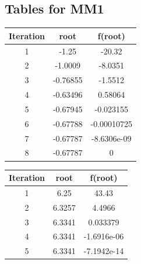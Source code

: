 \subsection{Tables for MM1}
\begin{center}
  \begin{tabular}{| c  c c |}
\hline
Iteration & root         & f(root) \\
\hline
1    &     -1.25  &        -20.32 \\
\hline
2    &   -1.0009  &       -8.0351 \\
\hline
3    &  -0.76855  &       -1.5512 \\
\hline
4    &  -0.63496  &       0.58064 \\
\hline
5    &  -0.67945  &     -0.023155 \\
\hline
6    & -0.67788   &  -0.00010725 \\
\hline
7    & -0.67787   &  -8.6306e-09 \\
\hline
8    &  -0.67787  &             0 \\
\hline
\hline

\end{tabular}
\end{center}

\begin{center}
  \begin{tabular}{| c  c c |}
\hline
Iteration & root         & f(root) \\
\hline
1   &     6.25   &        43.43 \\
\hline
2   &   6.3257   &       4.4966 \\
\hline
3   &  6.3341    &   0.033379 \\
\hline
4   &   6.3341   &  -1.6916e-06 \\
\hline
5   &   6.3341   &  -7.1942e-14 \\
\hline

\hline

\end{tabular}
\end{center}

